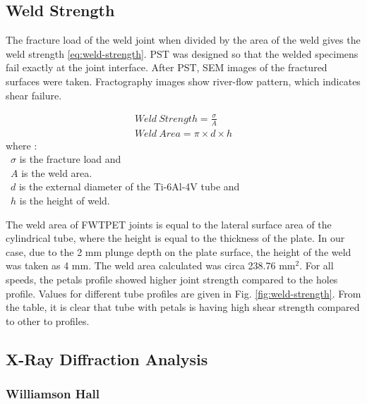 \documentclass[3p]{elsarticle}
\begin{document}
\subsection{Weld Strength}
\label{subsec:Weld Strength}
 The fracture load of the weld joint when divided by the area of the weld gives the weld strength \ref{eq:weld-strength}. PST was designed so that the welded specimens fail exactly at the joint interface. After PST, SEM images of the fractured surfaces were taken. Fractography images show river-flow pattern, which indicates shear failure.

\begin{gather} 
Weld\:Strength = \frac{\sigma}{A} \label{eq:weld-strength} \\
Weld\:Area = \pi \times d \times h \label{eq:weld-area}
\end{gather}
where :\\
~$\sigma$ is the fracture load and \\
~$A$ is the weld area. \\
~$d$ is the external diameter of the Ti-6Al-4V tube and \\
~$h$ is the height of weld.

The weld area of FWTPET joints is equal to the lateral surface area of the cylindrical tube, where the height is equal to the thickness of the plate. In our case, due to the 2 mm plunge depth on the plate surface, the height of the weld was taken as 4 mm. The weld area calculated was circa 238.76 mm$^{2}$. For all speeds, the petals profile showed higher joint strength compared to the holes profile. Values for different tube profiles are given in Fig. \ref{fig:weld-strength}. From the table, it is clear that tube with petals is having high shear strength compared to other to profiles.



\subsection{X-Ray Diffraction Analysis}
\label{subsec:XRD-Results}

\subsubsection{Williamson Hall}
\label{subsec:Williamson-Hall}
\end{document}
